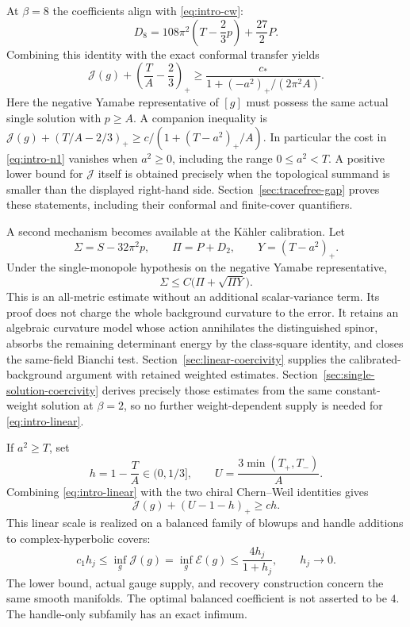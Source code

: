 \documentclass[10pt,a4paper]{article}
\theoremstyle{definition}
\theoremstyle{remark}
\numberwithin{equation}{section}
\providecommand{\E}{\mathcal E}
\providecommand{\J}{\mathcal J}
\begin{document}
At $\beta=8$ the coefficients align with \eqref{eq:intro-cw}:
\[
 D_8=108\pi^2\left(T-\frac23p\right)+\frac{27}{2}P.
\]
Combining this identity with the exact conformal transfer yields
\begin{equation}\label{eq:intro-n1}
 \J(g)+\left(\frac TA-\frac23\right)_+
 \ge\frac{c_*}{1+(-a^2)_+/(2\pi^2A)}.
\end{equation}
Here the negative Yamabe representative of $[g]$ must possess the same
actual single solution with $p\ge A$. A companion inequality is
$\J(g)+(T/A-2/3)_+\ge c/(1+(T-a^2)_+/A)$. In particular the
cost in \eqref{eq:intro-n1} vanishes when $a^2\ge0$, including the
range $0\le a^2<T$. A positive lower bound for $\J$ itself is obtained
precisely when the topological summand is smaller than the displayed
right-hand side. Section~\ref{sec:tracefree-gap} proves these statements,
including their conformal and finite-cover quantifiers.

A second mechanism becomes available at the Kähler calibration. Let
\[
 \Sigma=S-32\pi^2p,\qquad \Pi=P+D_2,
 \qquad Y=(T-a^2)_+.
\]
Under the single-monopole hypothesis on the negative Yamabe representative,
\begin{equation}\label{eq:intro-linear}
 \Sigma\le C\bigl(\Pi+\sqrt{\Pi Y}\bigr).
\end{equation}
This is an all-metric estimate without an additional scalar-variance
term. Its proof does not charge the whole background curvature to the
error. It retains an algebraic curvature model whose action annihilates
the distinguished spinor, absorbs the remaining determinant energy by
the class-square identity, and closes the same-field Bianchi test.
Section~\ref{sec:linear-coercivity} supplies the calibrated-background
argument with retained weighted estimates. Section~\ref{sec:single-solution-coercivity}
derives precisely those estimates from the same constant-weight solution
at $\beta=2$, so no further weight-dependent supply is needed for
\eqref{eq:intro-linear}.

If $a^2\ge T$, set
\[
 h=1-\frac TA\in(0,1/3],\qquad
 U=\frac{3\min(T_+,T_-)}{A}.
\]
Combining \eqref{eq:intro-linear} with the two chiral Chern--Weil
identities gives
\begin{equation}\label{eq:intro-window}
 \J(g)+(U-1-h)_+\ge ch.
\end{equation}
This linear scale is realized on a balanced family of blowups and
handle additions to complex-hyperbolic covers:
\[
 c_1h_j\le\inf_g\J(g)=\inf_g\E(g)
      \le\frac{4h_j}{1+h_j},\qquad h_j\longrightarrow0.
\]
The lower bound, actual gauge supply, and recovery construction concern
the same smooth manifolds. The optimal balanced coefficient is not
asserted to be $4$. The handle-only subfamily has an exact infimum.
\end{document}
